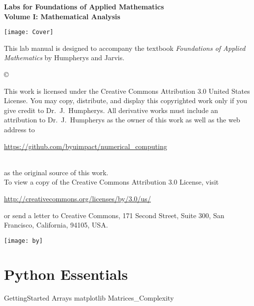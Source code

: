 \documentclass[nociteref]{SIAM-GH-book}
\begin{document}



\thispagestyle{empty}
\begin{center}
 
{\huge \bf Labs for Foundations of Applied Mathematics} \\
\vspace{5mm}
{\Large \bf Volume I: Mathematical Analysis}
\vspace{20mm}

\texttt{[image: Cover]}
\end{center}
\frontmatter




\begin{thepreface}
This lab manual is designed to accompany the textbook \emph{Foundations of Applied Mathematics} by Humpherys and Jarvis.

\vfill
\copyright{This work is licensed under the Creative Commons Attribution 3.0 United States
License.  You may copy, distribute, and display this copyrighted work only if you give
credit to Dr.~J.~Humpherys. All derivative works must include an attribution to Dr.~J.~Humpherys as the owner of this work as well as the web address to
\\\centerline{\url{https://github.com/byuimpact/numerical_computing}}\\ as the original source of
this
work.\\To view a copy of the Creative Commons Attribution 3.0 License,
visit\\\centerline{\url{http://creativecommons.org/licenses/by/3.0/us/}} or send a letter to
Creative Commons, 171 Second Street, Suite 300, San Francisco, California, 94105, USA.}

\vfill
\centering\texttt{[image: by]}
\vfill
\end{thepreface}

\setcounter{tocdepth}{1}
\tableofcontents

\mainmatter
\part{Python Essentials}
{GettingStarted}
{Arrays}
{matplotlib}
{Matrices_Complexity}
\end{document}
